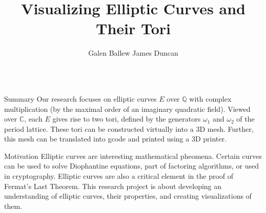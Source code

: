 \documentclass{beamer}
\title{Visualizing Elliptic Curves and Their Tori}
\author{Galen Ballew \quad James Duncan}
\institute{University of Illinois at Chicago}
\begin{document}
\begin{frame}{}
\begin{columns}[t]
\begin{column}{0.245\linewidth}

\begin{block}{Summary}
Our research focuses on elliptic curves $E$ over $\mathbb{Q}$ with complex multiplication (by the maximal order of an imaginary quadratic field). Viewed over $\mathbb{C}$, each $E$ gives rise to two tori, defined by the generators $\omega_1$ and $\omega_2$ of the period lattice. These tori can be constructed virtually into a 3D mesh. Further, this mesh can be translated into gcode and printed using a 3D printer. 
\end{block}

\begin{block}{Motivation}
Elliptic curves are interesting mathematical pheomena. Certain curves can be used to solve Diophantine equations, part of factoring algorithms, or used in cryptography. Elliptic curves are also a critical element in the proof of Fermat's Last Theorem. This research project is about developing an understanding of elliptic curves, their properties, and creating visualizations of them. 
\end{block}


\end{column}
\end{columns}
\end{frame}
\end{document}
